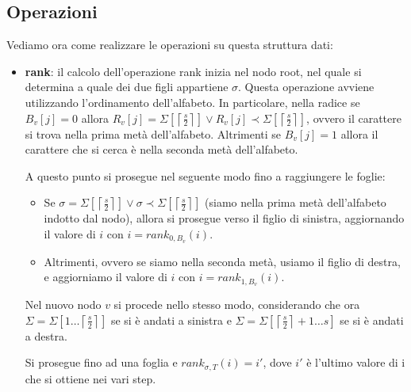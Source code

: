 \subsection{Operazioni}
Vediamo ora come realizzare le operazioni su questa struttura dati:
\begin{itemize}
    \item \textbf{rank}: il calcolo dell'operazione rank inizia nel nodo root,
          nel quale si determina a quale dei due figli appartiene $\sigma$.
          Questa operazione avviene utilizzando l'ordinamento dell'alfabeto. In
          particolare, nella radice se $B_v [j] = 0$ allora $R_v [j] = \Sigma
              \left[\left\lceil \frac{s}{2} \right\rceil\right] \lor R_v [j]
              \prec \Sigma \left[\left\lceil \frac{s}{2} \right\rceil\right]$,
          ovvero il carattere si trova nella prima metà dell'alfabeto. Altrimenti
          se $B_v[j] = 1$ allora il carattere che si cerca è nella seconda metà
          dell'alfabeto.

          A questo punto si prosegue nel seguente modo fino a raggiungere le foglie:
          \begin{itemize}
              \item Se $\sigma = \Sigma\left[\left\lceil \frac{s}{2} \right\rceil
                            \right] \lor \sigma \prec \Sigma\left[\left\lceil
                            \frac{s}{2} \right\rceil\right]$ (siamo nella prima
                    metà dell'alfabeto indotto dal nodo), allora si prosegue
                    verso il figlio di sinistra, aggiornando il valore di $i$ con
                    $i = rank_{0,B_v}(i)$.
              \item Altrimenti, ovvero se siamo nella seconda metà, usiamo il
                    figlio di destra, e aggiorniamo il valore di $i$ con $i =
                        rank_{1,B_v}(i)$.
          \end{itemize}
          Nel nuovo nodo $v$ si procede nello stesso modo, considerando che ora
          $\Sigma = \Sigma \left[1 \dots \left\lceil \frac{s}{2} \right\rceil\right]$
          se si è andati a sinistra e $\Sigma = \Sigma\left[\left\lceil
                  \frac{s}{2} \right\rceil + 1 \dots s\right]$ se si è andati a
          destra.

          Si prosegue fino ad una foglia e $rank_{\sigma,T} (i) = i'$, dove $i'$
          è l'ultimo valore di i che si ottiene nei vari step.


\end{itemize}
